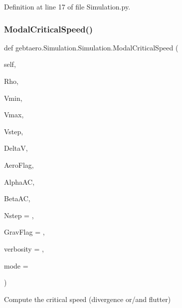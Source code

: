 Definition at line 17 of file Simulation.\+py.

\mbox{\label{classgebtaero_1_1_simulation_1_1_simulation_a9e1695e4fd6c14ac4c9ddcf488ba6b77}} 
\subsubsection{\texorpdfstring{Modal\+Critical\+Speed()}{ModalCriticalSpeed()}}
{\footnotesize\ttfamily def gebtaero.\+Simulation.\+Simulation.\+Modal\+Critical\+Speed (\begin{DoxyParamCaption}\item[{}]{self,  }\item[{}]{Rho,  }\item[{}]{Vmin,  }\item[{}]{Vmax,  }\item[{}]{Vstep,  }\item[{}]{DeltaV,  }\item[{}]{Aero\+Flag,  }\item[{}]{Alpha\+AC,  }\item[{}]{Beta\+AC,  }\item[{}]{Nstep = {},  }\item[{}]{Grav\+Flag = {},  }\item[{}]{verbosity = {},  }\item[{}]{mode = {} }\end{DoxyParamCaption})}



Compute the critical speed (divergence or/and flutter) 


